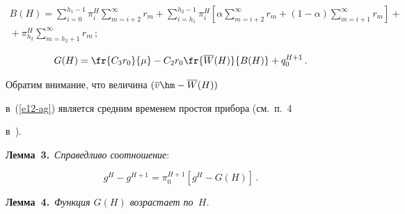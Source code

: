   \noindent


  \begin{multline*}


  B(H) = \sum\limits_{i=0}^{h_1-1} \pi_i^H \sum\limits_{m=i+2}^\infty r_m 


+\sum\limits_{i=h_1}^{h_2-1} \pi_i^H \left[ \alpha \sum\limits_{m=i+2}^\infty r_m 


+(1-\alpha) \sum\limits_{m=i+1}^\infty r_m\right]+{}\\


{}+ \pi^H_{h_2} 


\sum\limits_{m=h_2+1}^\infty r_m\,;


  \end{multline*}


  \begin{equation}


  G(H) =\fr{C_3 r_0}{\mu} -C_2r_0\fr{\overline{W}(H)}{B(H)}+q_0^{H+1}\,.


  \label{e13-ag}


  \end{equation}


  


  


  Обратим внимание, что величина $(\overline{v}\hm- \overline{W}(H))$ 


в~(\ref{e12-ag}) является средним временем простоя прибора (см.\ п.~4 


в~\cite{17-ag}).


  


  \smallskip


  


  \noindent


  \textbf{Лемма~3.}\ \textit{Справедливо соотношение}:


  \begin{equation}


  g^H-g^{H+1} =\pi_0^{H+1} \left[ g^H-G(H)\right]\,.


  \label{e14-ag}


  \end{equation}


  


  \noindent


  \textbf{Лемма~4.}\ \textit{Функция $G(H)$ возрастает по~$H$.}


  


